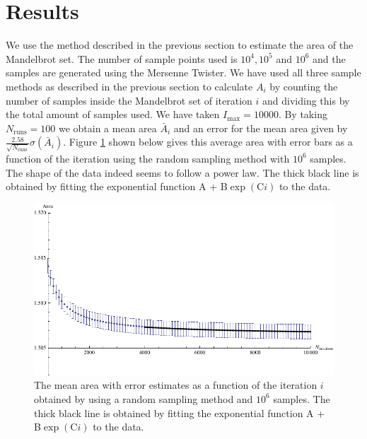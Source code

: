 \documentclass[10pt,a4paper]{article}
\begin{document}
\section{Results}

\noindent We use the method described in the previous section to estimate the area of the Mandelbrot set. The number of sample points used is $10^4, 10^5$ and $10^6$ and the samples are generated using the Mersenne Twister. We have used all three sample methods as described in the previous section to calculate $A_{i}$ by counting the number of samples inside the Mandelbrot set of iteration $i$ and dividing this by the total amount of samples used. We have taken $I_{\text{max}} = 10000$. By taking $N_{\text{runs}} = 100$ we obtain a mean area $\bar{A}_{i}$ and an error for the mean area given by $\frac{2.58}{\sqrt{N_{\text{runs}}}} \sigma(\bar{A}_{i})$. Figure \ref{fig:fit_example} shown below gives this average area with error bars as a function of the iteration using the random sampling method with $10^6$ samples. The shape of the data indeed seems to follow a power law. The thick black line is obtained by fitting the exponential function A + B$\exp(\text{C} i)$ to the data. 

\begin{figure}[H]
  \centering
  \includegraphics[scale=1.0]{fit_example.pdf}
  \caption{The mean area with error estimates as a function of the iteration $i$ obtained by using a random sampling method and $10^6$ samples. The thick black line  is obtained by fitting the exponential function A + B$\exp(\text{C} i)$ to the data.}
  \label{fig:fit_example}
\end{figure}
\end{document}
